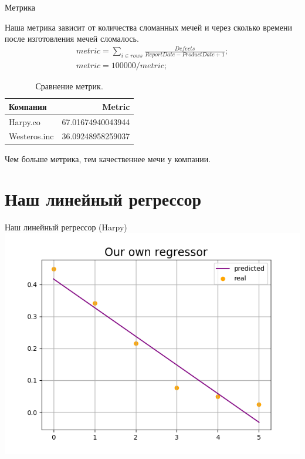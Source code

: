 \documentclass{beamer}
\begin{document}
\begin{frame}{Метрика}

Наша метрика зависит от количества сломанных мечей и через сколько времени после изготовления мечей сломалось.
    \begin{equation*}
    \begin{split}
        metric = \sum_{i \in rows} \frac{Defects}{ReportDate - ProductDate + 1} ;\\
        metric = 100000 / metric;
    \end{split}
    \end{equation*}

\begin{table}
\centering
\begin{tabular}{l|r}
Компания & Metric \\\hline
Harpy.co & 67.01674940043944 \\
Westeros.inc & 36.09248958259037
\end{tabular}
\caption{\label{tab:widgets}Сравнение метрик.}
\end{table}
Чем больше метрика, тем качественнее мечи у компании.
\end{frame}

\section{Наш линейный регрессор}

\begin{frame}{Наш линейный регрессор (Harpy)}
    \includegraphics[scale = 0.7]{Figure_4.png}
\end{frame}
\end{document}
